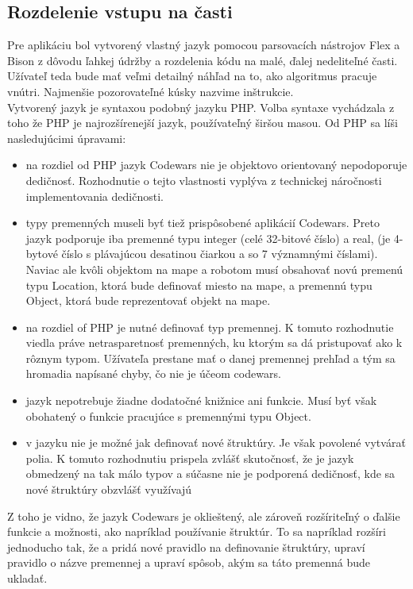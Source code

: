 \subsection{Rozdelenie vstupu na časti}
Pre aplikáciu bol vytvorený vlastný jazyk pomocou parsovacích nástrojov Flex a Bison z dôvodu ľahkej údržby a rozdelenia kódu na malé, ďalej nedeliteľné časti. Užívateľ teda bude mať veľmi detailný náhľad na to, ako algoritmus pracuje vnútri. Najmenšie pozorovateľné kúsky nazvime inštrukcie.\\
Vytvorený jazyk je syntaxou podobný jazyku PHP. Volba syntaxe vychádzala z toho že PHP je najrozšírenejší jazyk, používateľný širšou masou. Od PHP sa líši nasledujúcimi úpravami:
\begin{itemize}
\item na rozdiel od PHP jazyk Codewars nie je objektovo orientovaný nepodoporuje dedičnosť. Rozhodnutie o tejto vlastnosti vyplýva z technickej náročnosti implementovania dedičnosti.
\item typy premenných museli byť tiež prispôsobené aplikácií Codewars. Preto jazyk podporuje iba premenné typu integer (celé 32-bitové číslo) a real, (je 4-bytové  číslo s plávajúcou desatinou čiarkou a so 7 významnými číslami). Naviac ale kvôli objektom na mape a robotom musí obsahovať novú premenú typu Location, ktorá bude definovať miesto na mape, a premennú typu Object, ktorá bude reprezentovať objekt na mape.
\item na rozdiel of PHP je nutné definovať typ premennej. K tomuto rozhodnutie viedla práve netrasparetnosť premenných, ku ktorým sa dá pristupovať ako k rôznym typom. Užívateľa prestane mať o danej premennej prehľad a tým sa hromadia napísané chyby, čo nie je účeom codewars.
\item jazyk nepotrebuje žiadne dodatočné knižnice ani funkcie. Musí byť však obohatený o funkcie pracujúce s premennými typu Object.
\item v jazyku nie je možné jak definovať nové štruktúry. Je však povolené vytvárať polia. K tomuto rozhodnutiu prispela zvlášť skutočnosť, že je jazyk obmedzený na tak málo typov a súčasne nie je podporená dedičnosť, kde sa nové štruktúry obzvlášť využívajú 
\end{itemize}
Z toho je vidno, že jazyk Codewars je oklieštený, ale zároveň rozšíriteľný o ďalšie funkcie a možnosti, ako napríklad používanie štruktúr. To sa napríklad rozšíri jednoducho tak, že a pridá nové pravidlo na definovanie štruktúry, upraví pravidlo o názve premennej a upraví spôsob, akým sa táto premenná bude ukladať.%
